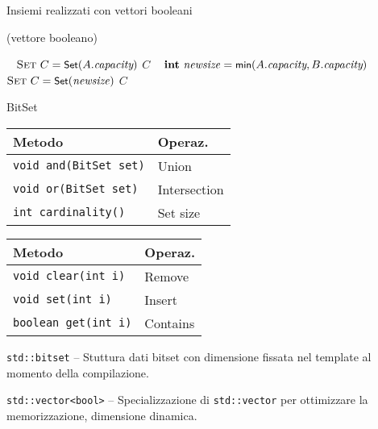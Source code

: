 \begin{frame}[shrink=12]{Insiemi realizzati con vettori booleani}

\vspace{-12pt}
\begin{Procedure}
\caption[A]{\Set (vettore booleano)}
\alert{\Set}\ 
{
  $\Set\ C = \setconstructor(A.\setcap)$\;
  {
  }
  \Return $C$\;
}
\BlankLine
\alert{\Set}\ 
{
  $\INTEGER\ \mathit{newsize} = \MIN(A.\setcap, B.\setcap)$\;
  $\textsc{Set}\ C = \textsf{{\small Set}}(\mathit{newsize})$\;
  {
  }
  \Return $C$\;
}
\end{Procedure}

\end{frame}

\begin{frame}{BitSet}


\medskip
{\footnotesize
\begin{tabular}{|l|l|}
\hline
\textbf{Metodo} & \textbf{Operaz.} \\\hline
\texttt{void and(BitSet set)} & Union \\\hline
\texttt{void or(BitSet set)} & Intersection \\\hline
\texttt{int cardinality()} & Set size \\\hline
\end{tabular}
\hfill
\begin{tabular}{|l|l|}
\hline
\textbf{Metodo} & \textbf{Operaz.} \\\hline
\texttt{void clear(int i)} & Remove \\\hline
\texttt{void set(int i)} & Insert \\\hline
\texttt{boolean get(int i)} & Contains \\\hline
\end{tabular}
}

\bigskip
{}

\BI
\item \alert{\texttt{std::bitset}} -- 
Stuttura dati bitset con dimensione fissata nel template al momento della compilazione.
\item \alert{\texttt{std::vector<bool>}} --
Specializzazione di \texttt{std::vector} per ottimizzare la memorizzazione, dimensione dinamica.
\EI


\end{frame}



